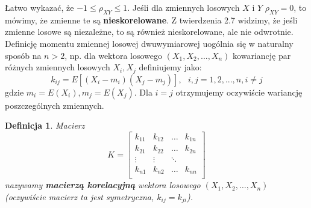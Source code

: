 \documentclass[10pt,a4paper]{article}
\newtheorem{defin}{Definicja}[section]
\begin{document}
Łatwo wykazać, że $-1\leq \rho_{XY} \leq 1$. Jeśli dla zmiennych losowych $X$ i $Y$ $\rho_{XY} = 0$, to mówimy, że zmienne te są
\textbf{nieskorelowane}.
Z twierdzenia 2.7 widzimy, że jeśli zmienne losowe są niezależne, to są również nieskorelowane, ale nie odwrotnie. Definicję momentu 
zmiennej losowej dwuwymiarowej uogólnia się w naturalny sposób na $n>2$, np. dla wektora losowego $(X_1, X_2, ..., X_n)$ kowariancję par
różnych zmiennych losowych $X_i,X_j$ definiujemy jako:
\begin{equation}
k_{ij}=E[(X_i-m_i)(X_j-m_j)],~~~i,j=1,2,...,n, i\neq j
\end{equation}
gdzie $m_i = E(X_i), m_j = E(X_j)$.
Dla $i=j$ otrzymujemy oczywiście wariancję poszczególnych zmiennych.
\begin{defin}
Macierz 
\begin{equation}
K = \left[ \begin{array}{llll}
k_{11} & k_{12} & \ldots &k_{1n} \\
k_{21} & k_{22} & \ldots &k_{2n} \\
\vdots & \vdots & \ddots \\
k_{n1} & k_{n2} & \ldots &k_{nn} \\
\end{array} \right]
\end{equation}
nazywamy \textbf{macierzą korelacyjną} wektora losowego $(X_1,X_2,\ldots,X_n)$ (oczywiście macierz ta jest symetryczna, $k_{ij}=k_{ji}$).
\end{defin}
\end{document}

